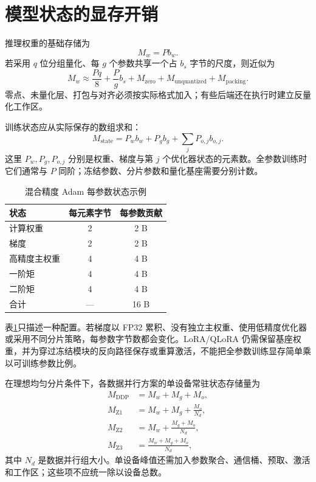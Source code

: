 \documentclass[../textbook.tex]{subfiles}
\begin{document}
\section{模型状态的显存开销}

推理权重的基础存储为
\begin{equation}
 M_w=Pb_w.
\end{equation}
若采用 $q$ 位分组量化、每 $g$ 个参数共享一个占 $b_s$ 字节的尺度，则近似为
\begin{equation}
 M_w\approx\frac{Pq}{8}+\frac{P}{g}b_s+M_{\mathrm{zero}}+M_{\mathrm{unquantized}}+M_{\mathrm{packing}}.
 \label{eq:appendix-quant-memory}
\end{equation}
零点、未量化层、打包与对齐必须按实际格式加入；有些后端还在执行时建立反量化工作区。

训练状态应从实际保存的数组求和：
\begin{equation}
 M_{\mathrm{state}}=P_wb_w+P_gb_g+\sum_jP_{o,j}b_{o,j}.
 \label{eq:appendix-training-state}
\end{equation}
这里 $P_w,P_g,P_{o,j}$ 分别是权重、梯度与第 $j$ 个优化器状态的元素数。全参数训练时它们通常与 $P$ 同阶；冻结参数、分片参数和量化基座需要分别计数。

\begin{table}[htbp]
\centering
\caption{混合精度 Adam 每参数状态示例}\label{tab:appendix-adam-bytes}
\begin{tabular}{lcc}
\toprule
状态 & 每元素字节 & 每参数贡献\\\midrule
计算权重 & 2 & 2 B\\
梯度 & 2 & 2 B\\
高精度主权重 & 4 & 4 B\\
一阶矩 & 4 & 4 B\\
二阶矩 & 4 & 4 B\\\midrule
合计 & — & 16 B\\
\bottomrule
\end{tabular}
\end{table}

表\ref{tab:appendix-adam-bytes}只描述一种配置。若梯度以 FP32 累积、没有独立主权重、使用低精度优化器或采用不同分片策略，每参数字节数都会变化。LoRA/QLoRA 仍需保留基座权重，并为穿过冻结模块的反向路径保存或重算激活，不能把全参数训练显存简单乘以可训练参数比例。

在理想均匀分片条件下，各数据并行方案的单设备常驻状态存储量为
\begin{align}
 M_{\mathrm{DDP}}&=M_w+M_g+M_o,\\
 M_{\mathrm{Z1}}&=M_w+M_g+\frac{M_o}{N_d},\\
 M_{\mathrm{Z2}}&=M_w+\frac{M_g+M_o}{N_d},\\
 M_{\mathrm{Z3}}&=\frac{M_w+M_g+M_o}{N_d},
\end{align}
其中 $N_d$ 是数据并行组大小。单设备峰值还需加入参数聚合、通信桶、预取、激活和工作区；这些项不应统一除以设备总数。
\end{document}
